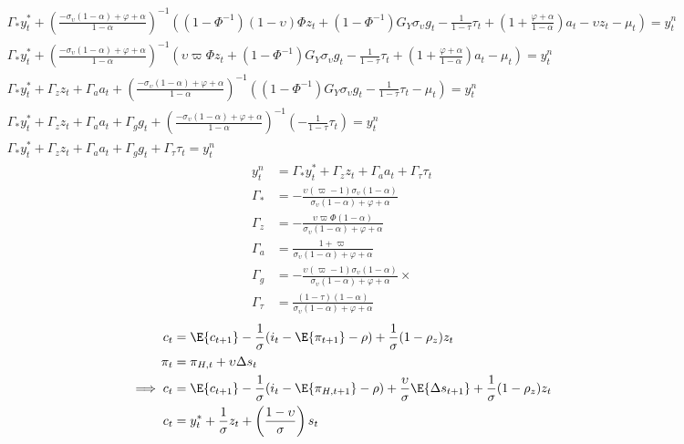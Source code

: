 \begin{align*}
    \Gamma_* y^*_t + \left(\frac{-\sigma_\upsilon(1-\alpha) + \varphi + \alpha}{1-\alpha}\right)^{-1}\left((1 - \Phi^{-1}) (1-\upsilon)\Phi z_t + (1 - \Phi^{-1}) G_Y \sigma_\upsilon g_t - \frac{1}{1-\tau}\tau_t  + \left(1 + \frac{\varphi + \alpha}{1-\alpha}\right)a_t - \upsilon z_t -\mu_t \right)= y^n_t\\
    \Gamma_* y^*_t + \left(\frac{-\sigma_\upsilon(1-\alpha) + \varphi + \alpha}{1-\alpha}\right)^{-1}\left(\upsilon \varpi \Phi z_t + (1 - \Phi^{-1}) G_Y \sigma_\upsilon g_t - \frac{1}{1-\tau}\tau_t  + \left(1 + \frac{\varphi + \alpha}{1-\alpha}\right)a_t -\mu_t \right)= y^n_t\\
    \Gamma_* y^*_t + \Gamma_z z_t + \Gamma_a a_t + \left(\frac{-\sigma_\upsilon(1-\alpha) + \varphi + \alpha}{1-\alpha}\right)^{-1}\left((1 - \Phi^{-1}) G_Y \sigma_\upsilon g_t - \frac{1}{1-\tau}\tau_t -\mu_t \right)= y^n_t\\
    \Gamma_* y^*_t + \Gamma_z z_t + \Gamma_a a_t + \Gamma_g g_t + \left(\frac{-\sigma_\upsilon(1-\alpha) + \varphi + \alpha}{1-\alpha}\right)^{-1}\left(- \frac{1}{1-\tau}\tau_t \right)= y^n_t\\
    \Gamma_* y^*_t + \Gamma_z z_t + \Gamma_a a_t + \Gamma_g g_t + \Gamma_\tau \tau_t = y^n_t
\end{align*}
\begin{align}
    y^n_t &= \Gamma_* y^*_t + \Gamma_z z_t + \Gamma_a a_t + \Gamma_\tau \tau_t \\
    \Gamma_* &= -\frac{\upsilon(\varpi - 1)\sigma_\upsilon(1-\alpha)}{\sigma_\upsilon (1-\alpha) + \varphi + \alpha} \\
    \Gamma_z &= -\frac{\upsilon \varpi \Phi (1-\alpha)}{\sigma_\upsilon (1-\alpha) + \varphi + \alpha} \\
    \Gamma_a &= \frac{1+\varpi}{\sigma_\upsilon (1-\alpha) + \varphi + \alpha} \\
    \Gamma_g &= -\frac{\upsilon(\varpi - 1)\sigma_\upsilon(1-\alpha)}{\sigma_\upsilon (1-\alpha) + \varphi + \alpha} \times\\
    \Gamma_\tau &= \frac{(1-\tau)(1-\alpha)}{\sigma_\upsilon (1-\alpha) + \varphi + \alpha}
\end{align}
\pagebreak
\begin{align}
    c_t &= \E\{ c_{t+1}\} - \frac{1}{\sigma}(i_t - \E \{ \pi_{t+1}\} - \rho) + \frac{1}{\sigma}(1-\rho_z)z_t\\
    \pi_t &= \pi_{H,t} + \upsilon \Delta s_t\\
    \implies c_t &= \E\{ c_{t+1}\} - \frac{1}{\sigma}(i_t - \E \{ \pi_{H,t+1}\} - \rho) + \frac{\upsilon}{\sigma}\E \{ \Delta s_{t+1} \} + \frac{1}{\sigma}(1-\rho_z)z_t\\
    c_t &= y_t^* + \frac{1}{\sigma}z_t + \left(\frac{1-\upsilon}{\sigma}\right)s_t
\end{align}
